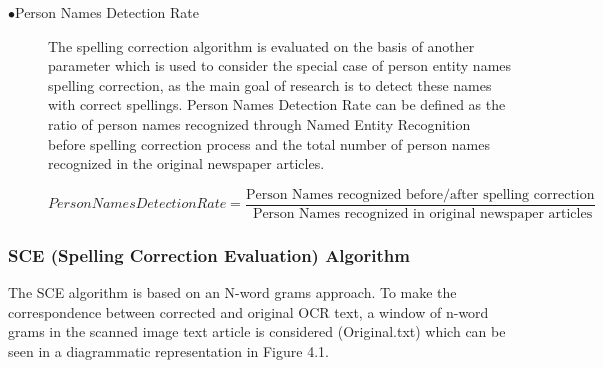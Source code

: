 \documentclass[letterpaper,11pt]{report}
\begin{document}
\begin{description}
\item[$\bullet$Person Names Detection Rate]

The spelling correction algorithm is evaluated on the basis of another parameter which is used to consider the special case of person entity names spelling correction, as the main goal of research is to detect these names with correct spellings.
Person Names Detection Rate can be defined as the ratio of person names recognized through Named Entity Recognition before spelling correction process and the total number of person names recognized in the original newspaper articles.

$Person Names Detection Rate=\dfrac{ \text{Person Names recognized before/after spelling correction}} {\text{ Person Names recognized in original newspaper articles}} $

\end{description}

\subsubsection{SCE (Spelling Correction Evaluation) Algorithm}

The SCE algorithm is based on an N-word grams approach. To make the correspondence between corrected and original OCR text, a window of n-word grams in the scanned image text article is considered (Original.txt) which can be seen in a diagrammatic representation in Figure 4.1.
\end{document}
